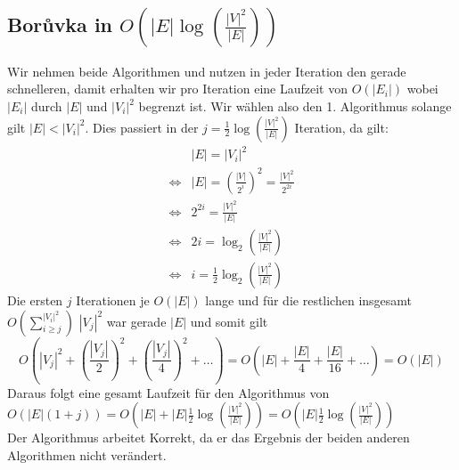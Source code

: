\documentclass[a4paper,11pt,twoside]{scrartcl}
\begin{document}
\subsection{Bor\r{u}vka in $O\left(|E|\log\left(\frac{|V|^2}{|E|}\right)\right)$}
Wir nehmen beide Algorithmen und nutzen in jeder Iteration den gerade schnelleren, damit erhalten wir pro Iteration eine Laufzeit von $O(|E_i|)$ wobei $|E_i|$ durch $|E|$ und $|V_i|^2$ begrenzt ist. Wir wählen also den 1. Algorithmus solange gilt $|E| < |V_i|^2$. Dies passiert in der $j = \frac{1}{2}\log\left(\frac{|V|^2}{|E|}\right)$ Iteration, da gilt:
\begin{align*}
				&|E| = |V_i|^2\\
\Leftrightarrow &|E| = \left(\frac{|V|}{2^i}\right)^2 = \frac{|V|^2}{2^{2i}}\\
\Leftrightarrow &2^{2i} = \frac{|V|^2}{|E|}\\
\Leftrightarrow &2i = \log_2\left(\frac{|V|^2}{|E|}\right)\\
\Leftrightarrow &i = \frac{1}{2}\log_2\left(\frac{|V|^2}{|E|}\right)
\end{align*}
Die ersten $j$ Iterationen je $O(|E|)$ lange und für die restlichen insgesamt $O\left(\sum_{i\geq j}^{|V_i|^2}\right)$ $|V_j|^2$ war gerade $|E|$ und somit gilt 
\[O\left( |V_j|^2 + \left(\frac{|V_j|}{2}\right)^2 + \left(\frac{|V_j|}{4}\right)^2+\ldots \right) = O\left( |E| + \frac{|E|}{4} + \frac{|E|}{16}+\ldots \right) = O(|E|)\]
Daraus folgt eine gesamt Laufzeit für den Algorithmus von $O(|E|(1+j)) = O\left( |E| + |E|\frac{1}{2}\log\left(\frac{|V|^2}{|E|}\right) \right) =  O\left( |E|\frac{1}{2}\log\left(\frac{|V|^2}{|E|}\right) \right)$\\
Der Algorithmus arbeitet Korrekt, da er das Ergebnis der beiden anderen Algorithmen nicht verändert.
\end{document}

